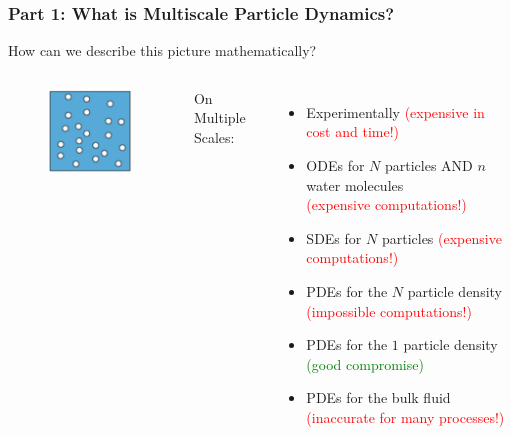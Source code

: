 \documentclass[aspectratio=169,xcolor=dvipsnames]{beamer}
\begin{document}
\begin{frame}
	\frametitle{Part 1: What is Multiscale Particle Dynamics?}
	How can we describe this picture mathematically?\\
	\vspace{1cm}
	\begin{columns}
		
		\begin{figure}
			\includegraphics[width=4cm]{Particles3.png}
		\end{figure}
		On Multiple Scales:
		\begin{itemize}
			\item Experimentally \textcolor{red}{(expensive in cost and time!)}
			\item ODEs for $N$ particles AND $n$ water molecules\\ \textcolor{red}{(expensive computations!)}
			\item SDEs for $N$ particles \textcolor{red}{(expensive computations!)}
			\item PDEs for the $N$ particle density  \textcolor{red}{(impossible computations!)}
			\item PDEs for the $1$ particle density \textcolor{green}{(good compromise)}
			\item PDEs for the bulk fluid \textcolor{red}{(inaccurate for many processes!)}
		\end{itemize}
	\end{columns}
\end{frame}
\end{document}
